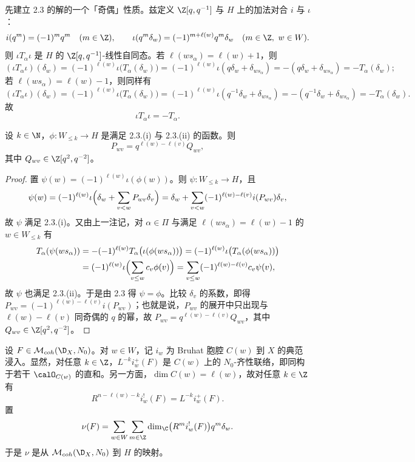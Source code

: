 先建立 2.3 的解的一个「奇偶」性质。兹定义 $\Z[q,q^{-1}]$ 与 $H$ 上的加法对合 $i$ 与 $\iota$：
$$i(q^m)=(-1)^mq^m\quad (m\in\Z),\qquad
\iota(q^m\delta_w)=(-1)^{m+\ell(w)}q^m\delta_w\quad (m\in\Z,\ w\in W).$$
则 $\iota T_\alpha\iota$ 是 $H$ 的 $\Z[q,q^{-1}]$-线性自同态。若 $\ell(ws_\alpha)=\ell(w)+1$，则
$$(\iota T_\alpha\iota)(\delta_w)=(-1)^{\ell(w)}\iota\bigl(T_\alpha(\delta_w)\bigr)
=(-1)^{\ell(w)}\iota(q\delta_w+\delta_{ws_\alpha})
=-(q\delta_w+\delta_{ws_\alpha})=-T_\alpha(\delta_w);$$
若 $\ell(ws_\alpha)=\ell(w)-1$，则同样有
$$(\iota T_\alpha\iota)(\delta_w)=(-1)^{\ell(w)}\iota\bigl(T_\alpha(\delta_w)\bigr)
=(-1)^{\ell(w)}\iota(q^{-1}\delta_w+\delta_{ws_\alpha})
=-(q^{-1}\delta_w+\delta_{ws_\alpha})=-T_\alpha(\delta_w).$$
故
$$\iota T_\alpha\iota=-T_\alpha.$$

\begin{lemma}\label{lem:05.2.4}
设 $k\in\N$，$\phi:W_{\leq k}\to H$ 是满足 2.3.(i) 与 2.3.(ii) 的函数。则
$$P_{wv}=q^{\ell(w)-\ell(v)}Q_{wv},$$
其中 $Q_{wv}\in\Z[q^2,q^{-2}]$。
\end{lemma}

\begin{proof}
置 $\psi(w)=(-1)^{\ell(w)}\iota(\phi(w))$。则 $\psi:W_{\leq k}\to H$，且
$$\psi(w)=(-1)^{\ell(w)}\iota\Bigl(\delta_w+\sum_{v<w}P_{wv}\delta_v\Bigr)
=\delta_w+\sum_{v<w}(-1)^{\ell(w)-\ell(v)}i(P_{wv})\delta_v,$$
故 $\psi$ 满足 2.3.(i)。又由上一注记，对 $\alpha\in\Pi$ 与满足 $\ell(ws_\alpha)=\ell(w)-1$ 的 $w\in W_{\leq k}$ 有
\begin{align*}
T_\alpha(\psi(ws_\alpha))
&=-(-1)^{\ell(w)}T_\alpha\bigl(\iota(\phi(ws_\alpha))\bigr)
=(-1)^{\ell(w)}\iota\bigl(T_\alpha(\phi(ws_\alpha))\bigr)\\
&=(-1)^{\ell(w)}\iota\Bigl(\sum_{v\leq w}c_v\phi(v)\Bigr)
=\sum_{v\leq w}(-1)^{\ell(w)-\ell(v)}c_v\psi(v),
\end{align*}
故 $\psi$ 也满足 2.3.(ii)。于是由 2.3 得 $\psi=\phi$。比较 $\delta_v$ 的系数，即得 $P_{wv}=(-1)^{\ell(w)-\ell(v)}i(P_{wv})$；也就是说，$P_{wv}$ 的展开中只出现与 $\ell(w)-\ell(v)$ 同奇偶的 $q$ 的幂，故 $P_{wv}=q^{\ell(w)-\ell(v)}Q_{wv}$，其中 $Q_{wv}\in\Z[q^2,q^{-2}]$。
\end{proof}

设 $F\in\mathcal{M}_{coh}(\D_X,N_0)$。对 $w\in W$，记 $i_w$ 为 Bruhat 胞腔 $C(w)$ 到 $X$ 的典范浸入。显然，对任意 $k\in\Z$，$L^{-k}i_w^+(F)$ 是 $C(w)$ 上的 $N_0$-齐性联络，即同构于若干 $\calO_{C(w)}$ 的直和。另一方面，$\dim C(w)=\ell(w)$，故对任意 $k\in\Z$ 有
$$R^{n-\ell(w)-k}i_w^!(F)=L^{-k}i_w^+(F).$$
置
$$\nu(F)=\sum_{w\in W}\sum_{m\in\Z}\dim_\C\bigl(R^mi_w^!(F)\bigr)q^m\delta_w.$$
于是 $\nu$ 是从 $\mathcal{M}_{coh}(\D_X,N_0)$ 到 $H$ 的映射。

